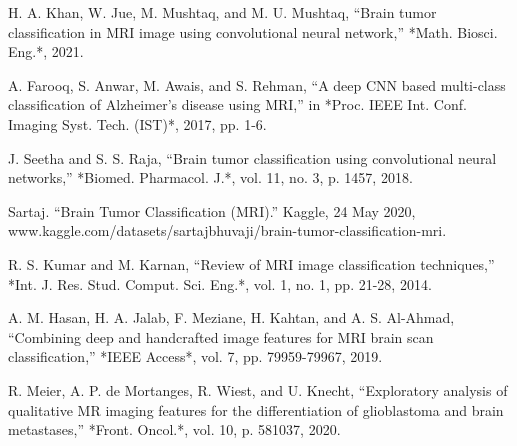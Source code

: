 \documentclass[conference]{IEEEtran}
\begin{document}
\begin{thebibliography}{00}

H. A. Khan, W. Jue, M. Mushtaq, and M. U. Mushtaq, “Brain tumor classification in MRI image using convolutional neural network,” *Math. Biosci. Eng.*, 2021. 

A. Farooq, S. Anwar, M. Awais, and S. Rehman, “A deep CNN based multi-class classification of Alzheimer's disease using MRI,” in *Proc. IEEE Int. Conf. Imaging Syst. Tech. (IST)*, 2017, pp. 1-6. 

J. Seetha and S. S. Raja, “Brain tumor classification using convolutional neural networks,” *Biomed. Pharmacol. J.*, vol. 11, no. 3, p. 1457, 2018.

Sartaj. “Brain Tumor Classification (MRI).” Kaggle, 24 May 2020, www.kaggle.com/datasets/sartajbhuvaji/brain-tumor-classification-mri. 

R. S. Kumar and M. Karnan, “Review of MRI image classification techniques,” *Int. J. Res. Stud. Comput. Sci. Eng.*, vol. 1, no. 1, pp. 21-28, 2014. 

A. M. Hasan, H. A. Jalab, F. Meziane, H. Kahtan, and A. S. Al-Ahmad, “Combining deep and handcrafted image features for MRI brain scan classification,” *IEEE Access*, vol. 7, pp. 79959-79967, 2019. 

R. Meier, A. P. de Mortanges, R. Wiest, and U. Knecht, “Exploratory analysis of qualitative MR imaging features for the differentiation of glioblastoma and brain metastases,” *Front. Oncol.*, vol. 10, p. 581037, 2020.

\end{thebibliography}
\end{document}
